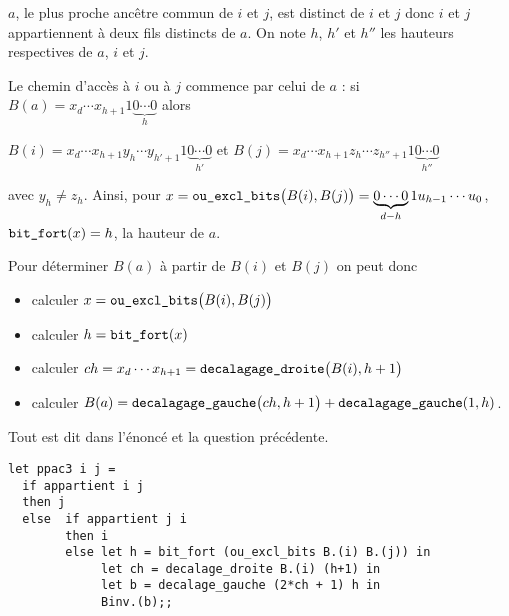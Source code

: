 \begin{Exercise}
$a$, le plus proche ancêtre commun de $i$ et $j$, est distinct de $i$ et $j$ donc $i$ et $j$ appartiennent à deux fils distincts de $a$. On note $h$, $h'$ et $h''$ les hauteurs respectives de $a$, $i$ et $j$.

Le chemin d'accès à $i$ ou à $j$ commence par celui de $a$ : si $B(a) = x_d\cdots x_{h+1}1\underbrace{0\cdots 0}_{h}$ alors

$B(i) = x_d\cdots x_{h+1}y_h\cdots y_{h'+1}1\underbrace{0\cdots 0}_{h'}$ et 
$B(j) = x_d\cdots x_{h+1}z_h\cdots z_{h''+1}1\underbrace{0\cdots 0}_{h''}$ 

avec $y_h \ne z_h$. Ainsi, pour $x = \text{\normalfont\ttfamily ou\_excl\_bits}\bigl(B(i),B(j)\bigr) = \underbrace{0\cdots 0}_{d-h}1u_{h-1}\cdots u_0$, $\text{\normalfont\ttfamily bit\_fort}(x) = h$, la hauteur de $a$.

\medskip

Pour déterminer $B(a)$ à partir de $B(i)$ et $B(j)$ on peut donc

\begin{itemize}
  \item calculer $x = \text{\normalfont\ttfamily ou\_excl\_bits}\bigl(B(i),B(j)\bigr)$
  \item calculer $h=\text{\normalfont\ttfamily bit\_fort}(x)$
  \item calculer $ch = x_d\cdots x_{h+1}=\text{\normalfont\ttfamily decalagage\_droite}\bigl(B(i),h+1\bigr)$
  \item calculer $B(a) = \text{\normalfont\ttfamily decalagage\_gauche}\bigl(ch,h+1\bigr)+\text{\normalfont\ttfamily decalagage\_gauche}(1,h)$.
\end{itemize}
\end{Exercise}
\begin{Exercise} Tout est dit dans l'énoncé et la question précédente.

\begin{lstlisting}
let ppac3 i j =
  if appartient i j 
  then j
  else  if appartient j i 
        then i
        else let h = bit_fort (ou_excl_bits B.(i) B.(j)) in
             let ch = decalage_droite B.(i) (h+1) in 
             let b = decalage_gauche (2*ch + 1) h in
             Binv.(b);;
\end{lstlisting}
\end{Exercise}
